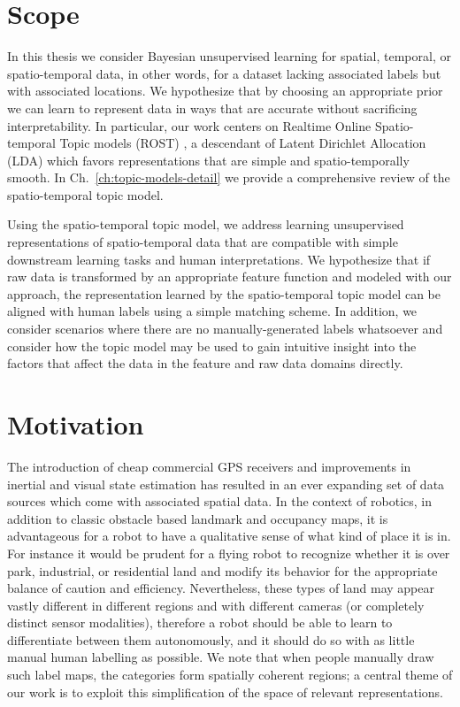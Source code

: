 \section{Scope}
In this thesis we consider Bayesian unsupervised learning for spatial, temporal, or spatio-temporal data, in other words, for a dataset lacking associated labels but with associated locations. We hypothesize that by choosing an appropriate prior we can learn to represent data in ways that are accurate without sacrificing interpretability. In particular, our work centers on Realtime Online Spatio-temporal Topic models (ROST) \citep{Girdhar2014}, a descendant of Latent Dirichlet Allocation (LDA) \citep{Blei2003} which favors representations that are simple and spatio-temporally smooth. In Ch.~\ref{ch:topic-models-detail} we provide a comprehensive review of the spatio-temporal topic model.

Using the spatio-temporal topic model, we address learning unsupervised representations of spatio-temporal data that are compatible with simple downstream learning tasks and human interpretations. We hypothesize that if raw data is transformed by an appropriate feature function and modeled with our approach, the representation learned by the spatio-temporal topic model can be aligned with human labels using a simple matching scheme. In addition, we consider scenarios where there are no manually-generated labels whatsoever and consider how the topic model may be used to gain intuitive insight into the factors that affect the data in the feature and raw data domains directly.

\section{Motivation}
The introduction of cheap commercial GPS receivers and improvements in inertial and visual state estimation has resulted in an ever expanding set of data sources which come with associated spatial data. In the context of robotics, in addition to classic obstacle based landmark and occupancy maps, it is advantageous for a robot to have a qualitative sense of what kind of place it is in. For instance it would be prudent for a flying robot to recognize whether it is over park, industrial, or residential land and modify its behavior for the appropriate balance of caution and efficiency. Nevertheless, these types of land may appear vastly different in different regions and with different cameras (or completely distinct sensor modalities), therefore a robot should be able to learn to differentiate between them autonomously, and it should do so with as little manual human labelling as possible. We note that when people manually draw such label maps, the categories form spatially coherent regions; a central theme of our work is to exploit this simplification of the space of relevant representations.

